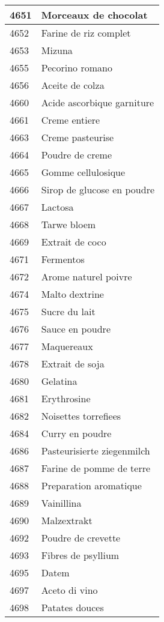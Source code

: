 \begin{longtable}{|l|l|}
4651 & Morceaux de chocolat \\ \hline 
4652 & Farine de riz complet \\ \hline 
4653 & Mizuna \\ \hline 
4655 & Pecorino romano \\ \hline 
4656 & Aceite de colza \\ \hline 
4660 & Acide ascorbique garniture \\ \hline 
4661 & Creme entiere \\ \hline 
4663 & Creme pasteurise \\ \hline 
4664 & Poudre de creme \\ \hline 
4665 & Gomme cellulosique \\ \hline 
4666 & Sirop de glucose en poudre \\ \hline 
4667 & Lactosa \\ \hline 
4668 & Tarwe bloem \\ \hline 
4669 & Extrait de coco \\ \hline 
4671 & Fermentos \\ \hline 
4672 & Arome naturel poivre \\ \hline 
4674 & Malto dextrine \\ \hline 
4675 & Sucre du lait \\ \hline 
4676 & Sauce en poudre \\ \hline 
4677 & Maquereaux \\ \hline 
4678 & Extrait de soja \\ \hline 
4680 & Gelatina \\ \hline 
4681 & Erythrosine \\ \hline 
4682 & Noisettes torrefiees \\ \hline 
4684 & Curry en poudre \\ \hline 
4686 & Pasteurisierte ziegenmilch \\ \hline 
4687 & Farine de pomme de terre \\ \hline 
4688 & Preparation aromatique \\ \hline 
4689 & Vainillina \\ \hline 
4690 & Malzextrakt \\ \hline 
4692 & Poudre de crevette \\ \hline 
4693 & Fibres de psyllium \\ \hline 
4695 & Datem \\ \hline 
4697 & Aceto di vino \\ \hline 
4698 & Patates douces \\ \hline 

\end{longtable}

